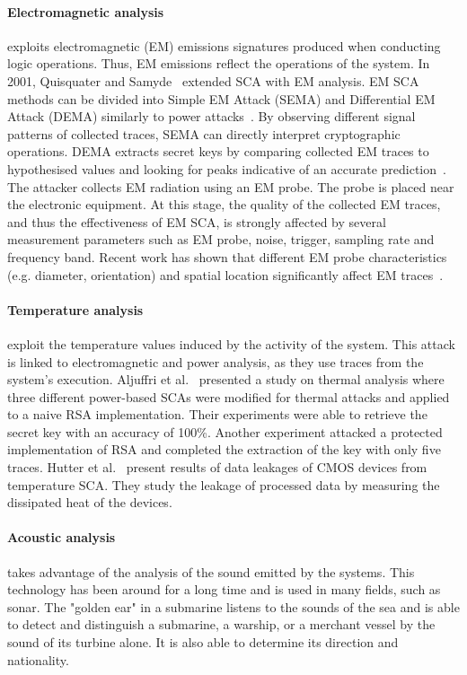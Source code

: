 \paragraph{Electromagnetic analysis} exploits electromagnetic (EM) emissions signatures produced when conducting logic operations. Thus, EM emissions reflect the operations of the system. In 2001, Quisquater and Samyde~\cite{QS-01-scps} extended SCA with EM analysis.
EM SCA methods can be divided into Simple EM Attack (SEMA) and Differential EM Attack (DEMA) similarly to power attacks~\cite{ANM-19-di}. By observing different signal patterns of collected traces, SEMA can directly interpret cryptographic operations. DEMA extracts secret keys by comparing collected EM traces to hypothesised values and looking for peaks indicative of an accurate prediction~\cite{HGTVJ-22-dt}.
The attacker collects EM radiation using an EM probe. The probe is placed near the electronic equipment. At this stage, the quality of the collected EM traces, and thus the effectiveness of EM SCA, is strongly affected by several measurement parameters such as EM probe, noise, trigger, sampling rate and frequency band. Recent work has shown that different EM probe characteristics (e.g. diameter, orientation) and spatial location significantly affect EM traces~\cite{HMHSS-12-tcrypo,KSTO-17-iccad, WDL-16-ntms}.

\paragraph{Temperature analysis} exploit the temperature values induced by the activity of the system. This attack is linked to electromagnetic and power analysis, as they use traces from the system's execution. Aljuffri et al.~\cite{AZRHT-21-tvlsi} presented a study on thermal analysis where three different power-based SCAs were modified for thermal attacks and applied to a naive RSA implementation. Their experiments were able to retrieve the secret key with an accuracy of 100\%. Another experiment attacked a protected implementation of RSA and completed the extraction of the key with only five traces. Hutter et al.~\cite{HS-14-cardis} present results of data leakages of CMOS devices from temperature SCA. They study the leakage of processed data by measuring the dissipated heat of the devices.

\paragraph{Acoustic analysis} takes advantage of the analysis of the sound emitted by the systems. This technology has been around for a long time and is used in many fields, such as sonar. The "golden ear" in a submarine listens to the sounds of the sea and is able to detect and distinguish a submarine, a warship, or a merchant vessel by the sound of its turbine alone. It is also able to determine its direction and nationality.


